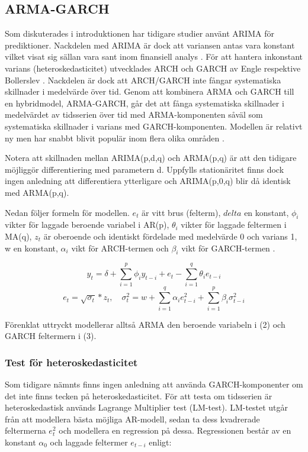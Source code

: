 \documentclass[12pt]{article}
\begin{document}
\subsection{ARMA-GARCH}
Som diskuterades i introduktionen har tidigare studier använt ARIMA för prediktioner. Nackdelen med ARIMA är dock att variansen antas vara konstant vilket visat sig sällan vara sant inom finansiell analys \parencite{montgomery2015forecasting}. För att hantera inkonstant varians (heteroskedasticitet) utvecklades ARCH och GARCH av Engle \parencite*{engle1982autoregressive} respektive Bollerslev \parencite*{bollerslev1986generalized}. Nackdelen är dock att ARCH/GARCH inte fångar systematiska skillnader i medelvärde över tid. Genom att kombinera ARMA och GARCH till en hybridmodel, ARMA-GARCH, går det att fånga systematiska skillnader i medelvärdet av tidsserien över tid med ARMA-komponenten såväl som systematiska skillnader i varians med GARCH-komponenten. Modellen är relativt ny men har snabbt blivit populär inom flera olika områden \parencite{chen2011short}. 
\par Notera att skillnaden mellan ARIMA(p,d,q) och ARMA(p,q) är att den tidigare möjliggör differentiering med parametern d. Uppfylls stationäritet finns dock ingen anledning att differentiera ytterligare och ARIMA(p,0,q) blir då identisk med ARMA(p,q). 
\par Nedan följer formeln för modellen. \(e_t\) är vitt brus (felterm), \(delta\) en konstant, \(\phi_i\) vikter för laggade beroende variabel i AR(p), \(\theta_i\) vikter för laggade feltermen i MA(q), \(z_t\) är oberoende och identiskt fördelade med medelvärde 0 och varians 1, w en konstant, \(\alpha_i\) vikt för ARCH-termen och \(\beta_i\) vikt för GARCH-termen \parencite{bollerslev1986generalized, montgomery2015forecasting}.

\begin{equation}
    y_t = \delta + \sum_{i=1}^{p}\phi_iy_{t-i}  +e_t - \sum_{i=1}^{q}\theta_i e_{t-i} 
\end{equation}
\begin{equation}
    e_t=\sqrt{\sigma_t}*z_t,\quad \sigma^2_t=w + \sum_{i=1}^{q}\alpha_i e^2_{t-i} + \sum_{i=1}^{p}\beta_i \sigma^2_{t-i}
\end{equation}

Förenklat uttryckt modellerar alltså ARMA den beroende variabeln i (2) och GARCH feltermern i (3).

\subsubsection{Test för heteroskedasticitet}
Som tidigare nämnts finns ingen anledning att använda GARCH-komponenter om det inte finns tecken på heteroskedasticitet. För att testa om tidsserien är heteroskedastisk används Lagrange Multiplier test (LM-test). LM-testet utgår från att modellera bästa möjliga AR-modell, sedan ta dess kvadrerade feltermerna \(e_t^2\) och modellera en regression på dessa. Regressionen består av en konstant \(\alpha_0\) och laggade feltermer \(e_{t-i}\) enligt:
\end{document}
